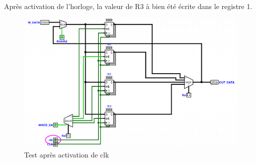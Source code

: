 \documentclass[a4paper]{article} %
\begin{document}
Après activation de l'horloge, la valeur de R3 à bien été écrite dans le registre 1.    
\begin{figure}[H]
    \includegraphics[width=1.3\textwidth]{src/TEST_REGISTERS_2.png}
    \caption{Test après activation de clk}
    \label{test_2}
\end{figure}
\end{document}
